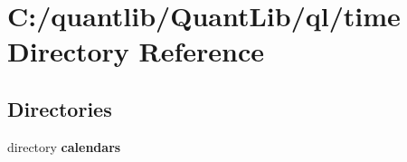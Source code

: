 \section{C\+:/quantlib/\+Quant\+Lib/ql/time Directory Reference}
\label{dir_aca95b6d1ef43b04a7b46fd23b9fd77d}
\subsection*{Directories}
\begin{DoxyCompactItemize}
\item 
directory {\bf calendars}
\end{DoxyCompactItemize}
